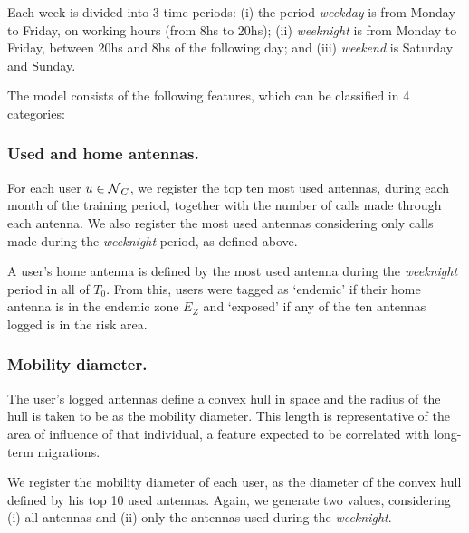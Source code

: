 Each week is divided into 3 time periods: (i) the period \textit{weekday} is from Monday to Friday, on working hours (from 8hs to 20hs); (ii) \textit{weeknight} is from Monday to Friday, between 20hs and 8hs of the following day;
and (iii) \textit{weekend} is Saturday and Sunday.

The model consists of the following features, which can be classified in 4 categories:


\subsubsection{Used and home antennas.}\label{homeantenna}

For each user $u \in \operatorname{\mathcal{N}}_C$, we register the top ten most used antennas, during each month of the training period,
together with the number of calls made through each antenna. 
%
%
We also register the most used antennas considering only calls made during the \textit{weeknight} period, as defined above. %

A user's home antenna is defined by the most used antenna during the \textit{weeknight} period in all of $T_0$.
From this, users were tagged as `endemic' if their home antenna is in the endemic zone $E_Z$ and `exposed' if any of the ten antennas logged is in the risk area.


\subsubsection{Mobility diameter.}

The user's logged antennas define a convex hull in space and the radius of the hull is taken to be as the mobility diameter. This length is representative of the area of influence of that individual, a feature expected to be correlated with long-term migrations.

We register the mobility diameter of each user, as the diameter of the convex hull defined by his top 10 used antennas. Again, we generate two values, considering (i) all antennas and (ii) only the antennas used during the \textit{weeknight}.



